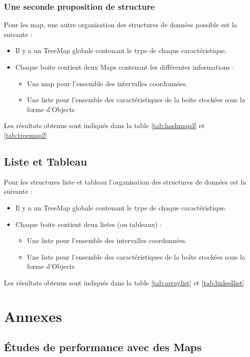 \subsection{Une seconde proposition de structure}
Pour les map, une autre organisation des structures de données possible est la suivante :
\begin{itemize}
\item Il y a un TreeMap globale contenant le type de chaque caractéristique.
 \item Chaque boite contient deux Maps contenant les différentes informations :
\begin{itemize}
 \item Une map pour l'ensemble des intervalles coordonnées.
\item Une liste pour l'ensemble des caractéristiques de la boîte stockées sous la forme d'Objects
\end{itemize}
\end{itemize}

Les résultats obtenus sont indiqués dans la table \ref{tab:hashmap3} et \ref{tab:treemap2}



\section{Liste et Tableau}
Pour les structures liste et tableau l'organisation des structures de données est la suivante :
\begin{itemize}
\item Il y a un TreeMap globale contenant le type de chaque caractéristique.
 \item Chaque boite contient deux listes (ou tableaux) :
\begin{itemize}
 \item Une liste pour l'ensemble des intervalles coordonnées.
\item Une liste pour l'ensemble des caractéristiques de la boîte stockées sous la forme d'Objects
\end{itemize}
\end{itemize}

Les résultats obtenus sont indiqués dans la table \ref{tab:arraylist} et \ref{tab:linkedlist}


\appendix

\chapter{Annexes}
\section{Études de performance avec des Maps}

